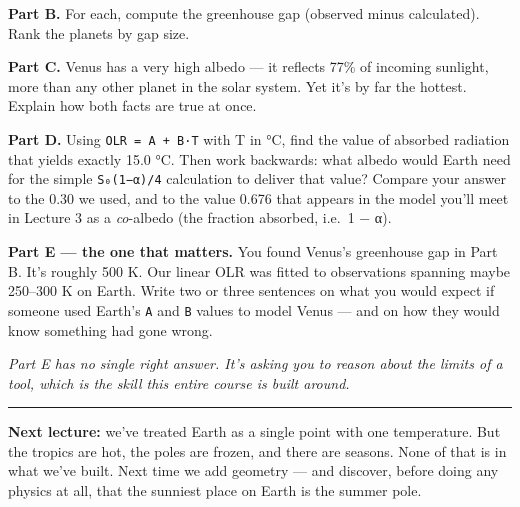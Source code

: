 \textbf{Part B.} For each, compute the greenhouse gap (observed minus
calculated). Rank the planets by gap size.

\textbf{Part C.} Venus has a very high albedo --- it reflects 77\% of
incoming sunlight, more than any other planet in the solar system. Yet
it's by far the hottest. Explain how both facts are true at once.

\textbf{Part D.} Using \texttt{OLR\ =\ A\ +\ B·T} with T in °C, find the
value of absorbed radiation that yields exactly 15.0 °C. Then work
backwards: what albedo would Earth need for the simple
\texttt{S₀(1−α)/4} calculation to deliver that value? Compare your
answer to the 0.30 we used, and to the value 0.676 that appears in the
model you'll meet in Lecture 3 as a \emph{co}-albedo (the fraction
absorbed, i.e.~1 − α).

\textbf{Part E --- the one that matters.} You found Venus's greenhouse
gap in Part B. It's roughly 500 K. Our linear OLR was fitted to
observations spanning maybe 250--300 K on Earth. Write two or three
sentences on what you would expect if someone used Earth's \texttt{A}
and \texttt{B} values to model Venus --- and on how they would know
something had gone wrong.

\emph{Part E has no single right answer. It's asking you to reason about
the limits of a tool, which is the skill this entire course is built
around.}

\begin{center}\rule{0.5\linewidth}{0.5pt}\end{center}

\textbf{Next lecture:} we've treated Earth as a single point with one
temperature. But the tropics are hot, the poles are frozen, and there
are seasons. None of that is in what we've built. Next time we add
geometry --- and discover, before doing any physics at all, that the
sunniest place on Earth is the summer pole.
